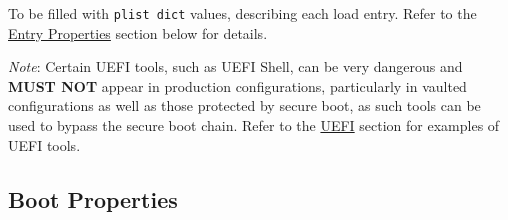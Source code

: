 \documentclass[]{article}
\begin{document}
\begin{enumerate}
  To be filled with \texttt{plist\ dict} values, describing each load entry.
  Refer to the \hyperref[miscentryprops]{Entry Properties} section below for details.

  \emph{Note}: Certain UEFI tools, such as UEFI Shell, can be very dangerous and
  \textbf{MUST NOT} appear in production configurations, particularly in vaulted
  configurations as well as those protected by secure boot, as such tools can be
  used to bypass the secure boot chain.
  Refer to the \hyperref[uefitools]{UEFI} section for examples of UEFI tools.

\end{enumerate}

\subsection{Boot Properties}\label{miscbootprops}
\end{document}

